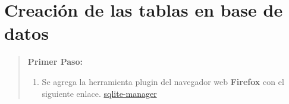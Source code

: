 \documentclass[letterpaper,11pt,spanish]{sphinxmanual}
\begin{document}
\chapter{Creación de las tablas en base de datos}
\label{_templates/Contenido6/manual_Parte1:creacion-de-las-tablas-en-base-de-datos}\label{_templates/Contenido6/manual_Parte1::doc}\begin{quote}

\textbf{Primer Paso:}
\begin{enumerate}
\item {} 
Se agrega la herramienta plugin del navegador web \textbf{Firefox} con el siguiente enlace. \href{https://addons.mozilla.org/es/firefox/addon/sqlite-manager/}{sqlite-manager}

\end{enumerate}
\end{quote}
\end{document}
